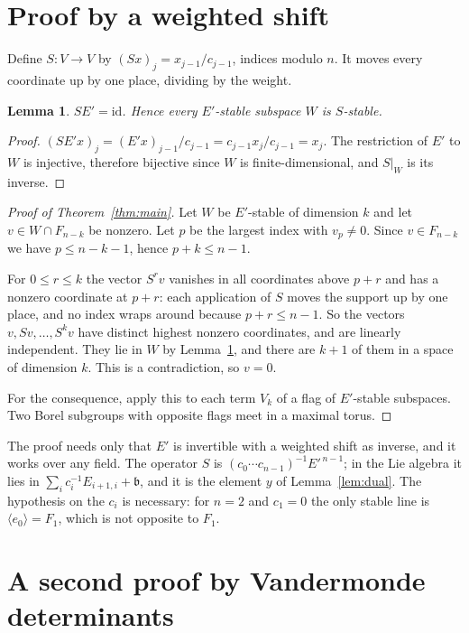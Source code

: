 \documentclass[11pt,a4paper]{amsart}
\newtheorem{lemma}[theorem]{Lemma}
\theoremstyle{definition}
\theoremstyle{remark}
\begin{document}
\section{Proof by a weighted shift}\label{sec:proof}

Define $S\colon V \to V$ by $(Sx)_j = x_{j-1}/c_{j-1}$, indices modulo $n$. It moves every coordinate up by one place, dividing by the weight.

\begin{lemma}\label{lem:inv}
$S E' = \mathrm{id}$. Hence every $E'$-stable subspace $W$ is $S$-stable.
\end{lemma}
\begin{proof}
$(SE'x)_j = (E'x)_{j-1}/c_{j-1} = c_{j-1}x_j/c_{j-1} = x_j$. The restriction of $E'$ to $W$ is injective, therefore bijective since $W$ is finite-dimensional, and $S|_W$ is its inverse.
\end{proof}

\begin{proof}[Proof of Theorem~\ref{thm:main}]
Let $W$ be $E'$-stable of dimension $k$ and let $v \in W \cap F_{n-k}$ be nonzero. Let $p$ be the largest index with $v_p \neq 0$. Since $v \in F_{n-k}$ we have $p \leq n-k-1$, hence $p + k \leq n-1$.

For $0 \leq r \leq k$ the vector $S^r v$ vanishes in all coordinates above $p+r$ and has a nonzero coordinate at $p+r$: each application of $S$ moves the support up by one place, and no index wraps around because $p+r \leq n-1$. So the vectors $v, Sv, \dots, S^k v$ have distinct highest nonzero coordinates, and are linearly independent. They lie in $W$ by Lemma~\ref{lem:inv}, and there are $k+1$ of them in a space of dimension $k$. This is a contradiction, so $v = 0$.

For the consequence, apply this to each term $V_k$ of a flag of $E'$-stable subspaces. Two Borel subgroups with opposite flags meet in a maximal torus.
\end{proof}

The proof needs only that $E'$ is invertible with a weighted shift as inverse, and it works over any field. The operator $S$ is $(c_0\cdots c_{n-1})^{-1}E'^{\,n-1}$; in the Lie algebra it lies in $\sum_i c_i^{-1}E_{i+1,i} + \mathfrak b$, and it is the element $y$ of Lemma~\ref{lem:dual}. The hypothesis on the $c_i$ is necessary: for $n=2$ and $c_1 = 0$ the only stable line is $\langle e_0\rangle = F_1$, which is not opposite to $F_1$.

\section{A second proof by Vandermonde determinants}\label{sec:vandermonde}
\end{document}
